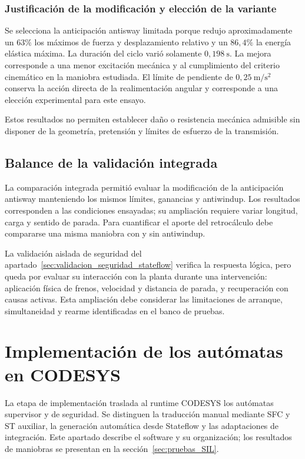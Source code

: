\documentclass[a4paper,10pt,onecolumn,journal]{ieeeconf}
\numberwithin{equation}{section}
\begin{document}
\subsubsection{Justificación de la modificación y elección de la variante}

Se selecciona la anticipación antisway limitada porque redujo aproximadamente un $63\%$ los máximos de fuerza y desplazamiento relativo y un $86{,}4\%$ la energía elástica máxima. La duración del ciclo varió solamente $0{,}198~\mathrm{s}$. La mejora corresponde a una menor excitación mecánica y al cumplimiento del criterio cinemático en la maniobra estudiada. El límite de pendiente de $0{,}25~\mathrm{m/s^2}$ conserva la acción directa de la realimentación angular y corresponde a una elección experimental para este ensayo.

Estos resultados no permiten establecer daño o resistencia mecánica admisible sin disponer de la geometría, pretensión y límites de esfuerzo de la transmisión.

\subsection{Balance de la validación integrada}

La comparación integrada permitió evaluar la modificación de la anticipación antisway manteniendo los mismos límites, ganancias y antiwindup. Los resultados corresponden a las condiciones ensayadas; su ampliación requiere variar longitud, carga y sentido de parada. Para cuantificar el aporte del retrocálculo debe compararse una misma maniobra con y sin antiwindup.

La validación aislada de seguridad del apartado~\ref{sec:validacion_seguridad_stateflow} verifica la respuesta lógica, pero queda por evaluar su interacción con la planta durante una intervención: aplicación física de frenos, velocidad y distancia de parada, y recuperación con causas activas. Esta ampliación debe considerar las limitaciones de arranque, simultaneidad y rearme identificadas en el banco de pruebas.
\par
{}

\section{Implementación de los autómatas en CODESYS}
\label{sec:implementacion_codesys}
La etapa de implementación traslada al runtime CODESYS los autómatas supervisor y de seguridad. Se distinguen la traducción manual mediante SFC y ST auxiliar, la generación automática desde Stateflow y las adaptaciones de integración. Este apartado describe el software y su organización; los resultados de maniobras se presentan en la sección~\ref{sec:pruebas_SIL}.
\end{document}
